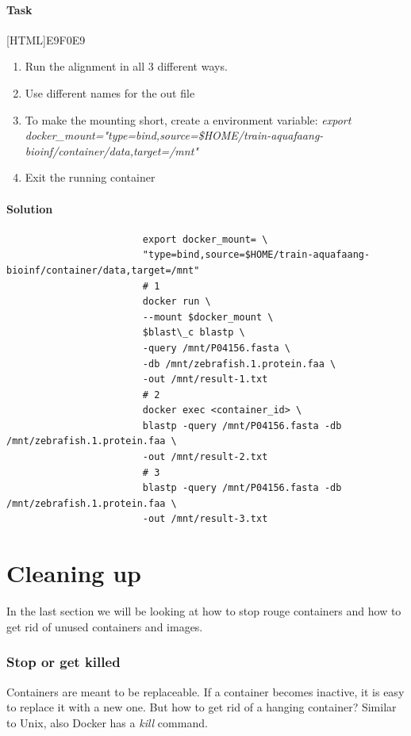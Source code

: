 \documentclass[12pt]{article}
\begin{document}
			\paragraph{Task}
				[HTML]{E9F0E9}{\parbox{\linewidth}{%
						\begin{enumerate}
							\item Run the alignment in all 3 different ways.
							\item Use different names for the out file
							\item To make the mounting short, create a environment variable:
							\textit{export docker\_mount="type=bind,source=\$HOME/train-aquafaang-bioinf/container/data,target=/mnt"}
							\item Exit the running container
						\end{enumerate}
				}}

			\paragraph{Solution}	
	
				\begin{minipage}{\linewidth}
					\begin{lstlisting}
						export docker_mount= \
						"type=bind,source=$HOME/train-aquafaang-bioinf/container/data,target=/mnt"
						# 1
						docker run \
						--mount $docker_mount \
						$blast\_c blastp \
						-query /mnt/P04156.fasta \
						-db /mnt/zebrafish.1.protein.faa \
						-out /mnt/result-1.txt
						# 2
						docker exec <container_id> \
						blastp -query /mnt/P04156.fasta -db /mnt/zebrafish.1.protein.faa \
						-out /mnt/result-2.txt
						# 3
						blastp -query /mnt/P04156.fasta -db /mnt/zebrafish.1.protein.faa \
						-out /mnt/result-3.txt
					\end{lstlisting}
				\end{minipage}
				
			
			\section{Cleaning up}
				In the last section we will be looking at how to stop rouge containers and how to get rid of unused containers and images.
			
				\subsubsection{Stop or get killed}
					Containers are meant to be replaceable. 
					If a container becomes inactive, it is easy to replace it with a new one. 
					But how to get rid of a hanging container? 
					Similar to Unix, also Docker has a \textit{kill} command.
\end{document}
